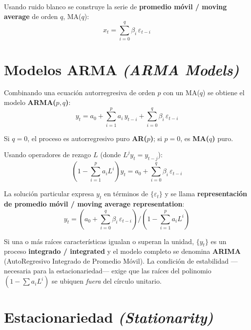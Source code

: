 \documentclass[12pt]{article}
\begin{document}
Usando ruido blanco se construye la serie de \textbf{promedio m\'ovil / moving average} de orden $q$, MA($q$):
\begin{equation}
x_t = \sum_{i=0}^{q} \beta_i\,\varepsilon_{t-i}
\end{equation}

\section{Modelos ARMA \textit{(ARMA Models)}}

Combinando una ecuaci\'on autorregresiva de orden $p$ con un MA($q$) se obtiene el modelo \textbf{ARMA($p,q$)}:
\begin{equation}
y_t = a_0 + \sum_{i=1}^{p} a_i\,y_{t-i} + \sum_{i=0}^{q} \beta_i\,\varepsilon_{t-i}
\end{equation}

Si $q=0$, el proceso es autorregresivo puro \textbf{AR($p$)}; si $p=0$, es \textbf{MA($q$)} puro.

Usando operadores de rezago $L$ (donde $L^j y_t = y_{t-j}$):
\begin{equation}
\left(1 - \sum_{i=1}^{p} a_i L^i\right)y_t
  = a_0 + \sum_{i=0}^{q} \beta_i\,\varepsilon_{t-i}
\end{equation}

La soluci\'on particular expresa $y_t$ en t\'erminos de $\{\varepsilon_t\}$ y se llama \textbf{representaci\'on de promedio m\'ovil / moving average representation}:
\begin{equation}
y_t = \left(a_0 + \sum_{i=0}^{q}\beta_i\,\varepsilon_{t-i}\right)
      \Bigg/
      \left(1 - \sum_{i=1}^{p} a_i L^i\right)
\end{equation}

Si una o m\'as ra\'ices caracter\'isticas igualan o superan la unidad, $\{y_t\}$ es un proceso \textbf{integrado / integrated} y el modelo completo se denomina \textbf{ARIMA} (AutoRegresivo Integrado de Promedio M\'ovil). La condici\'on de estabilidad ---necesaria para la estacionariedad--- exige que las ra\'ices del polinomio $(1-\sum a_i L^i)$ se ubiquen \textit{fuera} del c\'irculo unitario.

\section{Estacionariedad \textit{(Stationarity)}}
\end{document}

